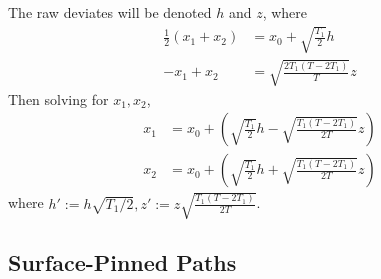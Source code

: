 The raw deviates will be denoted $h$ and $z$, where 
\begin{align}
  \frac{1}{2}(x_1+x_2) &= x_0 + \sqrt{\frac{T_1}{2}}h\\
  -x_1+x_2 &= \sqrt{\frac{2T_1(T-2T_1)}{T}}z
\end{align}
Then solving for $x_1, x_2$, 
\begin{align}
  x_1 & = x_0 + \left(\sqrt{\frac{T_1}{2}}h-\sqrt{\frac{T_1(T-2T_1)}{2T}}z\right)\\
  x_2 & = x_0 + \left(\sqrt{\frac{T_1}{2}}h+\sqrt{\frac{T_1(T-2T_1)}{2T}}z\right)
\end{align}
where $h' := h\sqrt{T_1/2}, z' := z\sqrt{\frac{T_1(T-2T_1)}{2T}}$.

\subsection{Surface-Pinned Paths}
\label{sec:path-pinning}

